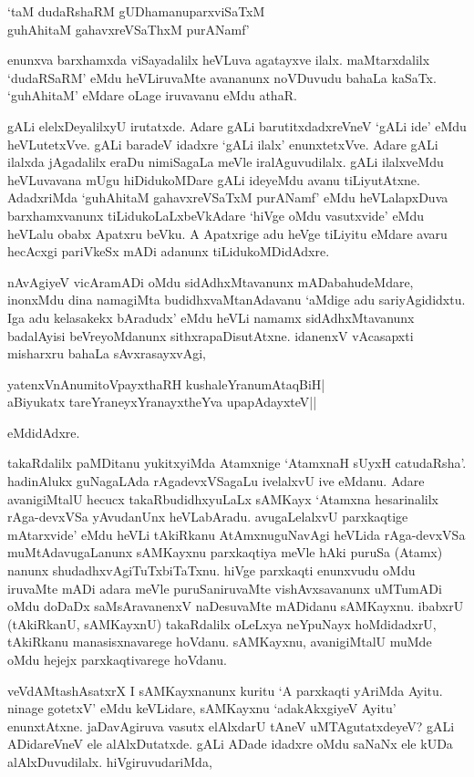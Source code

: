 \begin{shloka}
`taM dudaRshaRM gUDhamanuparxviSaTxM\\
guhAhitaM gahavxreVSaThxM purANamf'
\end{shloka}

enunxva barxhamxda viSayadalilx heVLuva agatayxve ilalx. maMtarxdalilx `dudaRSaRM' eMdu heVLiruvaMte avananunx noVDuvudu bahaLa kaSaTx. `guhAhitaM' eMdare oLage iruvavanu eMdu athaR.

gALi elelxDeyalilxyU irutatxde. Adare gALi barutitxdadxreVneV `gALi ide' eMdu heVLutetxVve. gALi baradeV idadxre `gALi ilalx' enunxtetxVve. Adare gALi ilalxda jAgadalilx eraDu nimiSagaLa meVle iralAguvudilalx. gALi ilalxveMdu heVLuvavana mUgu hiDidukoMDare gALi ideyeMdu avanu tiLiyutAtxne. AdadxriMda `guhAhitaM gahavxreVSaTxM purANamf' eMdu heVLalapxDuva barxhamxvanunx tiLidukoLaLxbeVkAdare `hiVge oMdu vasutxvide' eMdu heVLalu obabx Apatxru beVku. A Apatxrige adu heVge tiLiyitu eMdare avaru hecAcxgi pariVkeSx mADi adanunx tiLidukoMDidAdxre.

nAvAgiyeV vicAramADi oMdu sidAdhxMtavanunx mADabahudeMdare, inonxMdu dina namagiMta budidhxvaMtanAdavanu `aMdige adu sariyAgididxtu. Iga adu kelasakekx bAradudx' eMdu heVLi namamx sidAdhxMtavanunx badalAyisi beVreyoMdanunx sithxrapaDisutAtxne. idanenxV vAcasapxti misharxru bahaLa sAvxrasayxvAgi,

\begin{shloka}
yatenxVnAnumitoV\s payxthaRH kushaleYranumAtaqBiH|\\
aBiyukatx tareYraneyxYranayxtheYva upapAdayxteV||
\end{shloka}

eMdidAdxre.

takaRdalilx paMDitanu yukitxyiMda Atamxnige `AtamxnaH sUyxH catudaRsha'. hadinAlukx guNagaLAda rAgadevxVSagaLu ivelalxvU ive eMdanu. Adare avanigiMtalU hecucx takaRbudidhxyuLaLx sAMKayx `Atamxna hesarinalilx rAga-devxVSa yAvudanUnx heVLabAradu. avugaLelalxvU parxkaqtige mAtarxvide' eMdu heVLi tAkiRkanu AtAmxnuguNavAgi heVLida rAga-devxVSa muMtAdavugaLanunx sAMKayxnu parxkaqtiya meVle hAki puruSa (Atamx) nanunx shudadhxvAgiTuTxbiTaTxnu. hiVge parxkaqti enunxvudu oMdu iruvaMte mADi adara meVle puruSaniruvaMte vishAvxsavanunx uMTumADi oMdu doDaDx saMsAravanenxV naDesuvaMte mADidanu sAMKayxnu. ibabxrU (tAkiRkanU, sAMKayxnU) takaRdalilx oLeLxya neYpuNayx hoMdidadxrU, tAkiRkanu manasisxnavarege hoVdanu. sAMKayxnu, avanigiMtalU muMde oMdu hejejx parxkaqtivarege hoVdanu.

veVdAMtashAsatxrX I sAMKayxnanunx kuritu `A parxkaqti yAriMda Ayitu. ninage gotetxV' eMdu keVLidare, sAMKayxnu `adakAkxgiyeV Ayitu' enunxtAtxne. jaDavAgiruva vasutx elAlxdarU tAneV uMTAgutatxdeyeV? gALi ADidareVneV ele alAlxDutatxde. gALi ADade idadxre oMdu saNaNx ele kUDa alAlxDuvudilalx. hiVgiruvudariMda,

